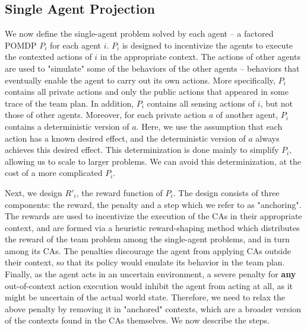 \documentclass[letterpaper]{article}
\theoremstyle{definition}
\newcommand{\cact}[1]{{\em CActions$_#1$}}
\begin{document}


\subsection{Single Agent Projection}
We now define the single-agent problem solved by each agent -- a factored POMDP $P_i$ for each agent $i$. $P_i$ is designed to incentivize the agents to execute the contexted actions of $i$ in the appropriate context.
The actions of other agents are used to "simulate" some of the behaviors of the other agents -- behaviors that eventually enable the agent to carry out its own actions.
More specifically, $P_i$ contains all private actions and only 
the public actions that appeared in some trace of the team plan. In addition, $P_i$ contains all sensing actions of $i$, but not those of other agents. 
Moreover, for each private action $a$ of another agent, $P_i$ contains a deterministic version of $a$. Here, we use the assumption that each action has a known desired effect, and the deterministic version of $a$ always achieves this desired effect. This determinization is done mainly to simplify $P_i$, allowing us to scale to larger problems. We can avoid this determinization, at the cost of a more complicated $P_i$.

Next, we design $R'_i$, the reward function of $P_i$. The design consists of three components: the reward, the penalty and a step which we refer to as "anchoring". The rewards are used to incentivize the execution of the CAs in their appropriate context, and are formed via a heuristic reward-shaping method which distributes the reward of the team problem among the single-agent problems, and in turn among its CAs. The penalties discourage the agent from applying CAs outside their context, so that its policy would emulate its behavior in the team plan. Finally, as the agent acts in an uncertain environment, a severe penalty for \textbf{any} out-of-context action execution would inhibit the agent from acting at all, as it might be uncertain of the actual world state. Therefore, we need to relax the above penalty by removing it in "anchored" contexts, which are a broader version of the contexts found in the CAs themselves. We now describe the steps.
\end{document}
